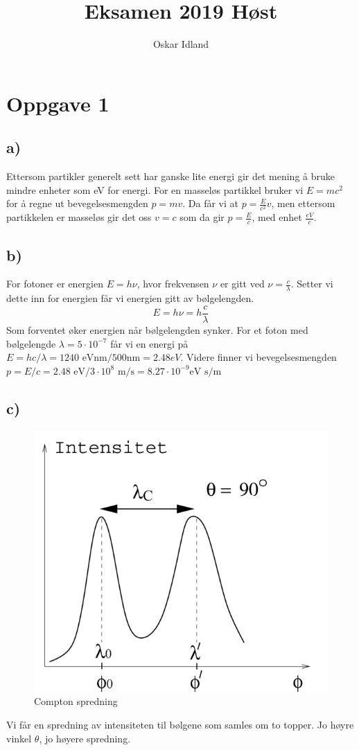 \documentclass{article}
\author{Oskar Idland}
\title{Eksamen 2019 Høst}
\date{}
\begin{document}
\maketitle
\newpage
\section*{Oppgave 1}
\subsection*{a)}
Ettersom partikler generelt sett har ganske lite energi gir det mening å bruke mindre enheter som eV for energi. For en masseløs partikkel bruker vi $E = mc^2$ for å regne ut bevegelsesmengden $p = mv$. Da får vi at $p = \frac{E}{c^2}v$, men ettersom partikkelen er masseløs gir det oss $v = c$ som da gir $p = \frac{E}{c}$, med enhet $\frac{eV}{c}$.

\subsection*{b)}
For fotoner er energien $E = hν $, hvor frekvensen $ν$ er gitt ved $ν = \frac{c}{λ}$. Setter vi dette inn for energien får vi energien gitt av bølgelengden. 
\[
E = hν = h \frac{c}{λ}
\]
Som forventet øker energien når bølgelengden synker. For et foton med bølgelengde $λ = 5 ⋅ 10^{-7}$ får vi en energi på $E = hc / λ = 1240 \text{ eVnm} / 500 \text{nm} = 2.48 eV$. 
Videre finner vi bevegelsesmengden $p = E / c = 2.48 \text{ eV} / 3 ⋅ 10^{8} \text{ m/s} = 8.27 ⋅ 10^{-9} \text{eV s/m}$

\subsection*{c)}
\begin{figure}[h!]
  \centering
  \includegraphics[width = \textwidth]{Compton_spredning.png}
  \caption{Compton spredning}
  \label{fig: Compton_spredning}
\end{figure}
Vi får en spredning av intensiteten til bølgene som samles om to topper. Jo høyre vinkel $θ$, jo høyere spredning. 
\end{document}
